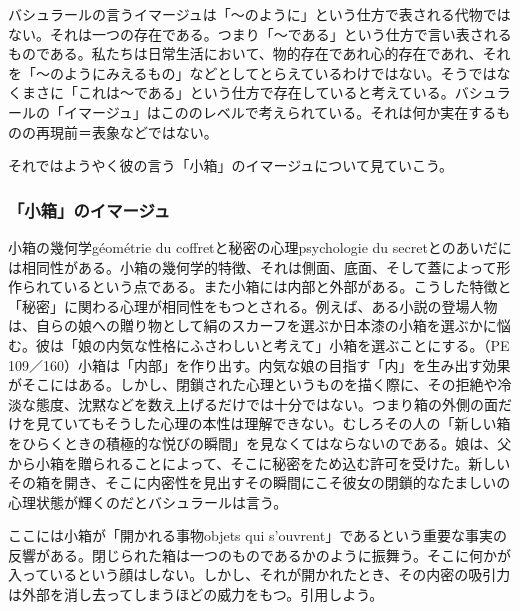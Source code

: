\documentclass[b5j,twoside,twocolumn]{utarticle}
\begin{document}
バシュラールの言うイマージュは「～のように」という仕方で表される代物ではない。それは一つの存在である。つまり「～である」という仕方で言い表されるものである。私たちは日常生活において、物的存在であれ心的存在であれ、それを「～のようにみえるもの」などとしてとらえているわけではない。そうではなくまさに「これは～である」という仕方で存在していると考えている。バシュラールの「イマージュ」はこののレベルで考えられている。それは何か実在するものの再現前＝表象などではない。


それではようやく彼の言う「小箱」のイマージュについて見ていこう。
\subsubsection{「小箱」のイマージュ}
小箱の幾何学géométrie du coffretと秘密の心理psychologie du secretとのあいだには相同性がある。小箱の幾何学的特徴、それは側面、底面、そして蓋によって形作られているという点である。また小箱には内部と外部がある。こうした特徴と「秘密」に関わる心理が相同性をもつとされる。例えば、ある小説の登場人物は、自らの娘への贈り物として絹のスカーフを選ぶか日本漆の小箱を選ぶかに悩む。彼は「娘の内気な性格にふさわしいと考えて」小箱を選ぶことにする。（PE 109／160）小箱は「内部」を作り出す。内気な娘の目指す「内」を生み出す効果がそこにはある。しかし、閉鎖された心理というものを描く際に、その拒絶や冷淡な態度、沈黙などを数え上げるだけでは十分ではない。つまり箱の外側の面だけを見ていてもそうした心理の本性は理解できない。むしろその人の「新しい箱をひらくときの積極的な悦びの瞬間」を見なくてはならないのである。娘は、父から小箱を贈られることによって、そこに秘密をため込む許可を受けた。新しいその箱を開き、そこに内密性を見出すその瞬間にこそ彼女の閉鎖的なたましいの心理状態が輝くのだとバシュラールは言う。


ここには小箱が「開かれる事物objets qui s'ouvrent」であるという重要な事実の反響がある。閉じられた箱は一つのものであるかのように振舞う。そこに何かが入っているという顔はしない。しかし、それが開かれたとき、その内密の吸引力は外部を消し去ってしまうほどの威力をもつ。引用しよう。
\end{document}
